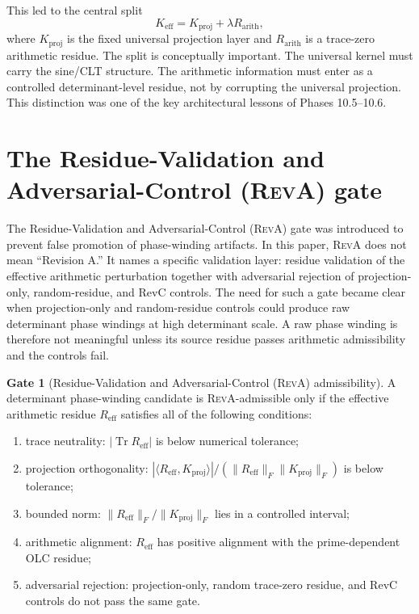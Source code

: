 \documentclass[11pt]{article}
\newcommand{\RevA}{\textsc{RevA}}
\newcommand{\RevAFull}{Residue-Validation and Adversarial-Control}
\newcommand{\Rarith}{R_{\mathrm{arith}}}
\newcommand{\Kproj}{K_{\mathrm{proj}}}
\newcommand{\Keff}{K_{\mathrm{eff}}}
\newcommand{\Tr}{\operatorname{Tr}}
\theoremstyle{definition}
\newtheorem{gate}{Gate}
\theoremstyle{plain}
\begin{document}
This led to the central split
\begin{equation}
  \Keff = \Kproj + \lambda\Rarith,
\end{equation}
where $\Kproj$ is the fixed universal projection layer and $\Rarith$ is a trace-zero arithmetic residue.  The split is conceptually important.  The universal kernel must carry the sine/CLT structure.  The arithmetic information must enter as a controlled determinant-level residue, not by corrupting the universal projection.  This distinction was one of the key architectural lessons of Phases 10.5--10.6.

\section{The \RevAFull{} (\RevA) gate}

The \RevAFull{} (\RevA) gate was introduced to prevent false promotion of phase-winding artifacts.  In this paper, \RevA{} does not mean ``Revision A.''  It names a specific validation layer: residue validation of the effective arithmetic perturbation together with adversarial rejection of projection-only, random-residue, and RevC controls.  The need for such a gate became clear when projection-only and random-residue controls could produce raw determinant phase windings at high determinant scale.  A raw phase winding is therefore not meaningful unless its source residue passes arithmetic admissibility and the controls fail.

\begin{gate}[\RevAFull{} (\RevA) admissibility]
A determinant phase-winding candidate is \RevA-admissible only if the effective arithmetic residue $R_{\mathrm{eff}}$ satisfies all of the following conditions:
\begin{enumerate}[label=(\roman*)]
  \item trace neutrality: $|\Tr R_{\mathrm{eff}}|$ is below numerical tolerance;
  \item projection orthogonality: $|\langle R_{\mathrm{eff}},\Kproj\rangle|/(\|R_{\mathrm{eff}}\|_F\|\Kproj\|_F)$ is below tolerance;
  \item bounded norm: $\|R_{\mathrm{eff}}\|_F/\|\Kproj\|_F$ lies in a controlled interval;
  \item arithmetic alignment: $R_{\mathrm{eff}}$ has positive alignment with the prime-dependent OLC residue;
  \item adversarial rejection: projection-only, random trace-zero residue, and RevC controls do not pass the same gate.
\end{enumerate}
\end{gate}
\end{document}
